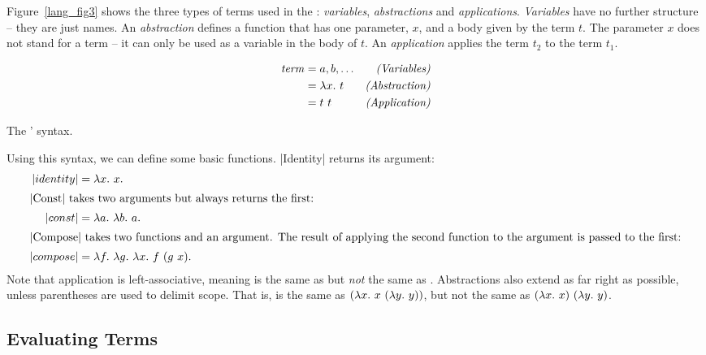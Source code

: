\documentclass[12pt]{report}
\begin{document}
Figure~\ref{lang_fig3} shows the three types of terms used in the
\lamA: \emph{variables}, \emph{abstractions} and
\emph{applications}. \emph{Variables} have no further structure --
they are just names. An \emph{abstraction} defines a function that has
one parameter, $x$, and a body given by the term $t$. The parameter
$x$ does not stand for a term -- it can only be used as a variable in
the body of $t$.  An \emph{application} applies the term $t_2$ to the
term $t_1$.

\begin{myfig}[th]
  \begin{minipage}{5in}
    \begin{align*}
      \mathit{term} &= a, b, \ldots & \hfill\text{\emph{(Variables)}} \\
      &= \lamAbs{x}{t} & \hfill\text{\emph{(Abstraction)}} \\ 
      &= \lamApp{t}{t} & \hfill\text{\emph{(Application)}}
    \end{align*}
  \end{minipage}
  \caption{The \lamA' syntax.}
  \label{lang_fig3}
\end{myfig}

Using this syntax, we can define some basic functions. |Identity|
returns its argument:
\begin{align}
  |identity| &= \lambda x.\ x. \label{lang_eq1} \\
  \intertext{|Const| takes two arguments but always returns the first:}
  |const| &= \lambda a.\ \lambda b.\ a. \label{lang_eq_const1} \\
  \intertext{|Compose| takes two functions and an argument. The result of
    applying the second function to the argument is passed to the first:}
  |compose| &= \lambda f.\ \lambda g.\ \lambda x.\ f\ (g\ x). \label{lang_eq_compose1} 
\end{align}
Note that application is left-associative, meaning
 is the same as 
but \emph{not} the same as . Abstractions
also extend as far right as possible, unless parentheses are used to
delimit scope. That is,  is the
same as $(\lambda x.\ x\ (\lambda y.\ y))$, but not the
same as $(\lambda x.\ x)\ (\lambda y.\ y)$.

\subsection{Evaluating \LamA Terms}
\label{lang_sec1_eval}
\end{document}
